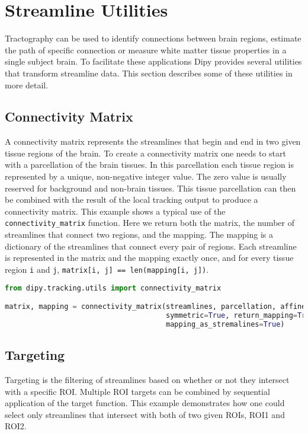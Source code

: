 \section{Streamline Utilities}

Tractography can be used to identify connections between brain regions, estimate the path of specific connection or measure white matter tissue properties in a single subject brain. To facilitate these applications Dipy provides several utilities that transform streamline data. This section describes some of these utilities in more detail.

\subsection{Connectivity Matrix}
A connectivity matrix represents the streamlines that begin and end in two given tissue regions of the brain. To create a connectivity matrix one needs to start with a parcellation of the brain tissues. In this parcellation each tissue region is represented by a unique, non-negative integer value. The zero value is usually reserved for background and non-brain tissues. This tissue parcellation can then be combined with the result of the local tracking output to produce a connectivity matrix. This example shows a typical use of the \verb|connectivity_matrix| function. Here we return both the matrix, the number of streamlines that connect two regions, and the mapping. The mapping is a dictionary of the streamlines that connect every pair of regions. Each streamline is represented in the matrix and the mapping exactly once, and for every tissue region \verb|i| and \verb|j|, \verb|matrix[i, j] == len(mapping[i, j])|.

\begin{lstlisting}[language=python]
from dipy.tracking.utils import connectivity_matrix

matrix, mapping = connectivity_matrix(streamlines, parcellation, affine=affine,
                                      symmetric=True, return_mapping=True,
                                      mapping_as_stremalines=True)
\end{lstlisting}

\subsection{Targeting}
Targeting is the filtering of streamlines based on whether or not they intersect with a specific ROI. Multiple ROI targets can be combined by sequential application of the target function. This example demonstrates how one could select only streamlines that intersect with both of two given ROIs, ROI1 and ROI2.

